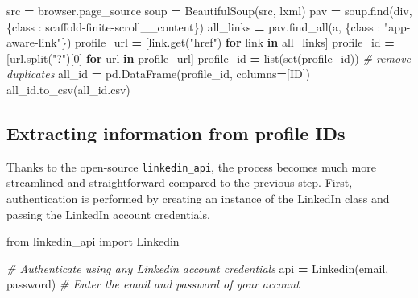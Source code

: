 \documentclass[11pt,]{article}
\newenvironment{Shaded}{\begin{snugshade}}{\end{snugshade}}
\newcommand{\BuiltInTok}[1]{#1}
\newcommand{\CommentTok}[1]{\textcolor[rgb]{0.56,0.35,0.01}{\textit{#1}}}
\newcommand{\ControlFlowTok}[1]{\textcolor[rgb]{0.13,0.29,0.53}{\textbf{#1}}}
\newcommand{\DecValTok}[1]{\textcolor[rgb]{0.00,0.00,0.81}{#1}}
\newcommand{\ImportTok}[1]{#1}
\newcommand{\KeywordTok}[1]{\textcolor[rgb]{0.13,0.29,0.53}{\textbf{#1}}}
\newcommand{\NormalTok}[1]{#1}
\newcommand{\OperatorTok}[1]{\textcolor[rgb]{0.81,0.36,0.00}{\textbf{#1}}}
\newcommand{\StringTok}[1]{\textcolor[rgb]{0.31,0.60,0.02}{#1}}
\begin{document}
\begin{Shaded}
\begin{Highlighting}[]
\NormalTok{src }\OperatorTok{=}\NormalTok{ browser.page\_source}
\NormalTok{soup }\OperatorTok{=}\NormalTok{ BeautifulSoup(src, }\StringTok{\textquotesingle{}lxml\textquotesingle{}}\NormalTok{)}
\NormalTok{pav }\OperatorTok{=}\NormalTok{ soup.find(}\StringTok{\textquotesingle{}div\textquotesingle{}}\NormalTok{, \{}\StringTok{\textquotesingle{}class\textquotesingle{}}\NormalTok{ : }\StringTok{\textquotesingle{}scaffold{-}finite{-}scroll\_\_content\textquotesingle{}}\NormalTok{\})}
\NormalTok{all\_links }\OperatorTok{=}\NormalTok{ pav.find\_all(}\StringTok{\textquotesingle{}a\textquotesingle{}}\NormalTok{, \{}\StringTok{\textquotesingle{}class\textquotesingle{}}\NormalTok{ : }\StringTok{"app{-}aware{-}link"}\NormalTok{\})}
\NormalTok{profile\_url }\OperatorTok{=}\NormalTok{ [link.get(}\StringTok{"href"}\NormalTok{) }\ControlFlowTok{for}\NormalTok{ link }\KeywordTok{in}\NormalTok{ all\_links]}
\NormalTok{profile\_id }\OperatorTok{=}\NormalTok{ [url.split(}\StringTok{"?"}\NormalTok{)[}\DecValTok{0}\NormalTok{] }\ControlFlowTok{for}\NormalTok{ url }\KeywordTok{in}\NormalTok{ profile\_url]}
\NormalTok{profile\_id }\OperatorTok{=} \BuiltInTok{list}\NormalTok{(}\BuiltInTok{set}\NormalTok{(profile\_id)) }\CommentTok{\# remove duplicates}
\NormalTok{all\_id }\OperatorTok{=}\NormalTok{ pd.DataFrame(profile\_id, columns}\OperatorTok{=}\NormalTok{[}\StringTok{\textquotesingle{}ID\textquotesingle{}}\NormalTok{])}
\NormalTok{all\_id.to\_csv(}\StringTok{\textquotesingle{}all\_id.csv\textquotesingle{}}\NormalTok{)}
\end{Highlighting}
\end{Shaded}

\hypertarget{extracting-information-from-profile-ids}{%
\subsection{Extracting information from profile
IDs}\label{extracting-information-from-profile-ids}}

Thanks to the open-source \texttt{linkedin\_api}, the process becomes
much more streamlined and straightforward compared to the previous step.
First, authentication is performed by creating an instance of the
LinkedIn class and passing the LinkedIn account credentials.

\begin{Shaded}
\begin{Highlighting}[]
\ImportTok{from}\NormalTok{ linkedin\_api }\ImportTok{import}\NormalTok{ Linkedin}

\CommentTok{\# Authenticate using any Linkedin account credentials}
\NormalTok{api }\OperatorTok{=}\NormalTok{ Linkedin(email, password) }\CommentTok{\# Enter the email and password of your account}
\end{Highlighting}
\end{Shaded}
\end{document}
